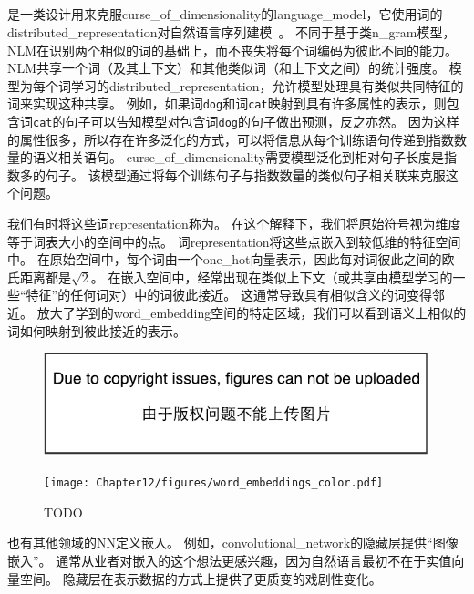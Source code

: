 \subsection{}
\label{sec:neural_language_models}

是一类设计用来克服\gls{curse_of_dimensionality}的\gls{language_model}，它使用词的\gls{distributed_representation}对自然语言序列建模~\citep{BenDucVin01-small}。
不同于基于类\gls{n_gram}模型，\gls{NLM}在识别两个相似的词的基础上，而不丧失将每个词编码为彼此不同的能力。
\gls{NLM}共享一个词（及其上下文）和其他类似词（和上下文之间）的统计强度。
模型为每个词学习的\gls{distributed_representation}，允许模型处理具有类似共同特征的词来实现这种共享。
例如，如果词{\tt dog}和词{\tt cat}映射到具有许多属性的表示，则包含词{\tt cat}的句子可以告知模型对包含词{\tt dog}的句子做出预测，反之亦然。
因为这样的属性很多，所以存在许多泛化的方式，可以将信息从每个训练语句传递到指数数量的语义相关语句。
\gls{curse_of_dimensionality}需要模型泛化到相对句子长度是指数多的句子。
该模型通过将每个训练句子与指数数量的类似句子相关联来克服这个问题。


我们有时将这些词\gls{representation}称为。
在这个解释下，我们将原始符号视为维度等于词表大小的空间中的点。
词\gls{representation}将这些点嵌入到较低维的特征空间中。
在原始空间中，每个词由一个\gls{one_hot}向量表示，因此每对词彼此之间的欧氏距离都是$\sqrt{2}$。
在嵌入空间中，经常出现在类似上下文（或共享由模型学习的一些``特征''的任何词对）中的词彼此接近。
这通常导致具有相似含义的词变得邻近。
放大了学到的\gls{word_embedding}空间的特定区域，我们可以看到语义上相似的词如何映射到彼此接近的表示。

\begin{figure}[htp]
\centering
\ifOpenSource
\centerline{\includegraphics{figure.pdf}}
\else
\texttt{[image: Chapter12/figures/word\_embeddings\_color.pdf]}
\fi
\caption{TODO}
\label{fig:chap12_word_embeddings_color}
\end{figure}

也有其他领域的\gls{NN}定义嵌入。
例如，\gls{convolutional_network}的隐藏层提供``图像嵌入''。
通常从业者对嵌入的这个想法更感兴趣，因为自然语言最初不在于实值向量空间。
隐藏层在表示数据的方式上提供了更质变的戏剧性变化。

